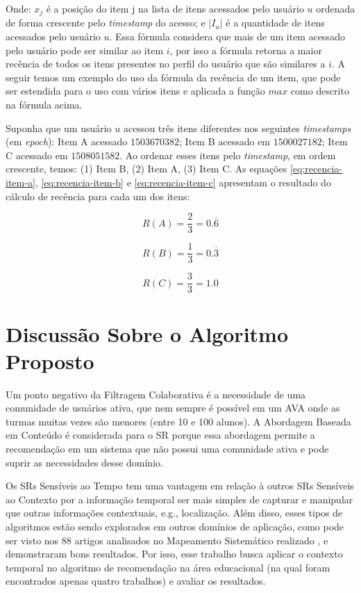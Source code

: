Onde: $x_j$ é a posição do item j na lista de itens acessados pelo usuário $u$ ordenada de forma crescente pelo
\textit{timestamp} do acesso; e $\left| I_u \right|$ é a quantidade de itens acessados pelo usuário $u$. Essa fórmula considera
que mais de um item acessado pelo usuário pode ser similar ao item $i$, por isso a fórmula retorna a maior recência de
todos os itens presentes no perfil do usuário que são similares a $i$. A seguir temos um exemplo do uso da fórmula da
recência de um item, que pode ser estendida para o uso com vários itens e aplicada a função $max$ como descrito na
fórmula acima.

Suponha que um usuário $u$ acessou três itens diferentes nos seguintes \textit{timestamps} (em \textit{epoch}): Item A acessado $1503670382$;
Item B acessado em $1500027182$; Item C acessado em $1508051582$. Ao ordenar esses itens pelo \textit{timestamp}, em ordem
crescente, temos: (1) Item B, (2) Item A, (3) Item C. As equações \ref{eq:recencia-item-a}, \ref{eq:recencia-item-b} e
\ref{eq:recencia-item-c} apresentam o resultado do cálculo de recência para cada um dos itens:

\begin{equation}
  R(A) = \frac{2}{3} = 0.\overline{6}
  \label{eq:recencia-item-a}
\end{equation}

\begin{equation}
  R(B) = \frac{1}{3} = 0.\overline{3}
  \label{eq:recencia-item-b}
\end{equation}

\begin{equation}
  R(C) = \frac{3}{3} = 1.0
  \label{eq:recencia-item-c}
\end{equation}

\section{Discussão Sobre o Algoritmo Proposto}

Um ponto negativo da Filtragem Colaborativa é a necessidade de uma comunidade de usuários ativa, que nem sempre é
possível em um AVA onde as turmas muitas vezes são menores (entre 10 e 100 alunos). A Abordagem Baseada
em Conteúdo é considerada para o SR porque essa abordagem permite a recomendação em um sistema que não possui uma
comunidade ativa e pode suprir as necessidades desse domínio.

Os SRs Sensíveis ao Tempo tem uma vantagem em relação à outros SRs Sensíveis ao Contexto por a informação temporal ser
mais simples de capturar e manipular que outras informações contextuais, e.g., localização. Além disso, esses tipos de
algoritmos estão sendo explorados em outros domínios de aplicação, como pode ser visto nos 88 artigos analisados no
Mapeamento Sistemático realizado \cite{de2017time}, e demonstraram bons resultados. Por isso, esse trabalho busca
aplicar o contexto temporal no algoritmo de recomendação na área educacional (na qual foram encontrados apenas quatro
trabalhos) e avaliar os resultados.

